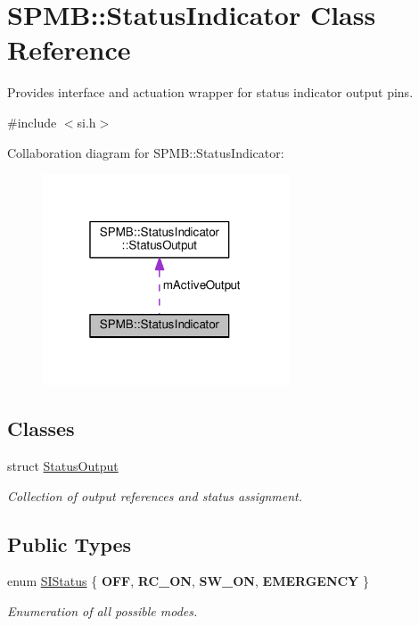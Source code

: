 \hypertarget{classSPMB_1_1StatusIndicator}{}\section{S\+P\+MB\+:\+:Status\+Indicator Class Reference}
\label{classSPMB_1_1StatusIndicator}


Provides interface and actuation wrapper for status indicator output pins.  




{\ttfamily \#include $<$si.\+h$>$}



Collaboration diagram for S\+P\+MB\+:\+:Status\+Indicator\+:\nopagebreak
\begin{figure}[H]
\begin{center}
\leavevmode
\includegraphics[width=208pt]{classSPMB_1_1StatusIndicator__coll__graph}
\end{center}
\end{figure}
\subsection*{Classes}
\begin{DoxyCompactItemize}
\item 
struct \hyperlink{structSPMB_1_1StatusIndicator_1_1StatusOutput}{Status\+Output}
\begin{DoxyCompactList}\small\item\em Collection of output references and status assignment. \end{DoxyCompactList}\end{DoxyCompactItemize}
\subsection*{Public Types}
\begin{DoxyCompactItemize}
\item 
enum \hyperlink{classSPMB_1_1StatusIndicator_a6d5ae5d45a9147ec76bd72da143fb4de}{S\+I\+Status} \{ {\bfseries O\+FF}, 
{\bfseries R\+C\+\_\+\+ON}, 
{\bfseries S\+W\+\_\+\+ON}, 
{\bfseries E\+M\+E\+R\+G\+E\+N\+CY}
 \}\hypertarget{classSPMB_1_1StatusIndicator_a6d5ae5d45a9147ec76bd72da143fb4de}{}\label{classSPMB_1_1StatusIndicator_a6d5ae5d45a9147ec76bd72da143fb4de}
\begin{DoxyCompactList}\small\item\em Enumeration of all possible modes. \end{DoxyCompactList}
\end{DoxyCompactItemize}
